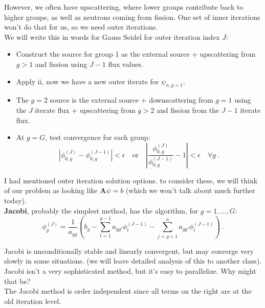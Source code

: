 \documentclass[12pt]{article}
\newcommand{\ve}[1]{\ensuremath{\mathbf{#1}}}
\begin{document}
%
However, we often have upscattering, where lower groups contribute back to higher groups, as well as neutrons coming from fission. One set of inner iterations won't do that for us, so we need outer iterations. \\
We will write this in words for Gauss Seidel for outer iteration index $J$:
%
\begin{itemize}
\item Construct the source for group 1 as the external source + upscattering from $g>1$ and fission using $J-1$ flux values.
\item Apply ii, now we have a new outer iterate for $\psi_{n,g=1}$.
\item The $g=2$ source is the external source + downscattering from $g=1$ using the $J$ iterate flux + upscattering from $g>2$ and fission from the $J-1$ iterate flux. 
\item At $g=G$, test convergence for each group:
\[
|\phi_{0,g}^{(J)} - \phi_{0,g}^{(J-1)}| < \epsilon \quad \text{or} \quad |\frac{\phi_{0,g}^{(J)}}{\phi_{0,g}^{(J-1)}} - 1| < \epsilon \quad \forall g \:.
\]
\end{itemize}
I had mentioned outer iteration solution options. to consider these, we will think of our problem as looking like $\ve{A} \psi = b$ (which we won't talk about much further today).\\
\textbf{Jacobi}, probably the simplest method, 
%
has the algorithm, for $g = 1, \dots, G$:
\[\phi^{(J)}_g = \frac{1}{a_{gg}}(b_g - \sum_{t=1}^{g-1} a_{gg'} \phi_t^{(J-1)} - \sum_{j=g+1}^{n} a_{gg'} \phi_t^{(J-1)})\:.\]

Jacobi is unconditionally stable and linearly convergent, but may converge very slowly in some situations. (we will leave detailed analysis of this to another class). \\
%
%
Jacobi isn't a very sophisticated method, but it's easy to parallelize. Why might that be? \\The Jacobi method is order independent since all terms on the right are at the old iteration level. 
\end{document}
